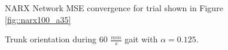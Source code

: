 			\begin{figure}
				\centering
				\caption{NARX Network MSE convergence for trial shown in Figure \ref{fig::narx100_a35}} 
				\label{fig::narx100_a35_nne}
			\end{figure}
			\begin{figure}
				\centering
				\caption{Trunk orientation during 60 $\frac{mm}{s}$ gait with $\alpha = 0.125$.}
				\label{fig::narx60_a125_nne}
			\end{figure}

